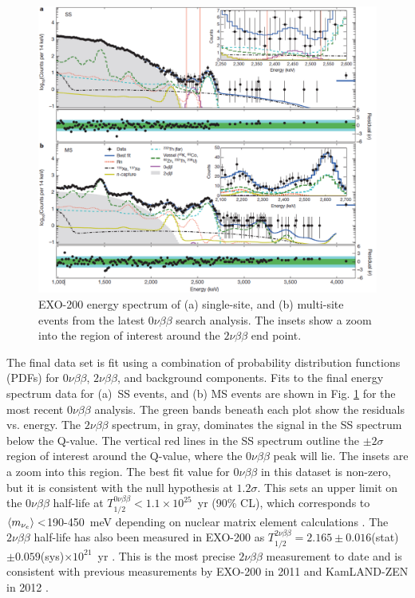 \begin{figure} %
	\centering
	\includegraphics[width=.95\textwidth]{figures/0nu_spectrum_nature.png}
	\caption{EXO-200 energy spectrum of (a) single-site, and (b) multi-site events from the latest $0\nu\beta\beta$ search analysis.  The insets show a zoom into the region of interest around the $2\nu\beta\beta$ end point. \cite{EXO2000nuNature}}
\label{fig:exo200data}
\end{figure}

The final data set is fit using a combination of probability distribution functions (PDFs) for $0\nu\beta\beta$, $2\nu\beta\beta$, and background components.  Fits to the final energy spectrum data for (a)~SS events, and (b) MS events are shown in Fig. \ref{fig:exo200data} for the most recent $0\nu\beta\beta$ analysis.  The green bands beneath each plot show the residuals vs. energy.  The $2\nu\beta\beta$ spectrum, in gray, dominates the signal in the SS spectrum below the Q-value.  The vertical red lines in the SS spectrum outline the $\pm 2 \sigma$ region of interest around the Q-value, where the $0\nu\beta\beta$ peak will lie.  The insets are a zoom into this region.  The best fit value for $0\nu\beta\beta$ in this dataset is non-zero, but it is consistent with the null hypothesis at $1.2 \sigma$.  This sets an upper limit on the $0\nu\beta\beta$ half-life at $T^{0\nu\beta\beta}_{1/2} < 1.1 \times 10^{25}$~yr (90\% CL), which corresponds to $\braket{m_{\nu_{e}}} < $190-450~meV depending on nuclear matrix element calculations \cite{EXO2000nuNature}.  The $2\nu\beta\beta$ half-life has also been measured in EXO-200 as $T^{2\nu\beta\beta}_{1/2} = 2.165 \pm 0.016$(stat)$ \pm 0.059$(sys)$ \times 10^{21}$~yr \cite{EXO200TwoNuLong}.  This is the most precise $2\nu\beta\beta$ measurement to date and is consistent with previous measurements by EXO-200 in 2011 \cite{EXO200TwoNuOriginal} and KamLAND-ZEN in 2012 \cite{KamLAND}.

